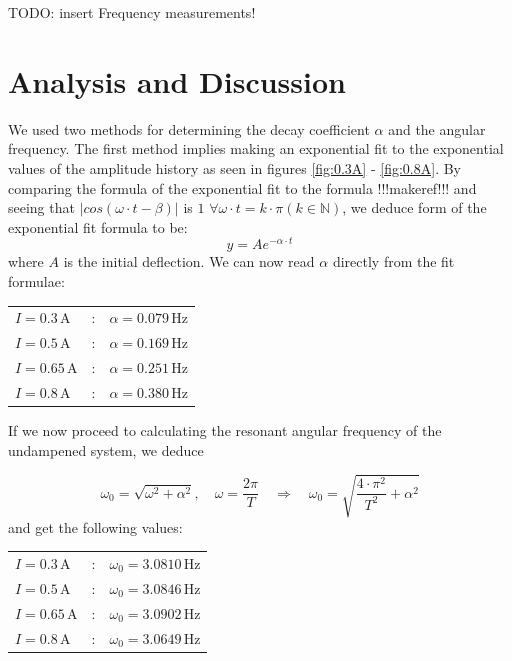 \documentclass{scrreprt}
\newcommand{\unit}[1]{\ensuremath{\, \mathrm{#1}}}
\begin{document}
TODO: insert Frequency measurements!


\section{Analysis and Discussion}
We used two methods for determining the decay coefficient $\alpha$ and the angular frequency. The first method implies making an exponential fit to the exponential values of the amplitude history as seen in figures \ref{fig:0.3A} - \ref{fig:0.8A}.  By comparing the formula of the exponential fit to the formula !!!makeref!!! and seeing that $\lvert cos(\omega\cdot t-\beta)\rvert$ is $1$ $\forall \omega \cdot t = k \cdot \pi (k \in \mathbb{N})$, we deduce form of the exponential fit formula to be:
\begin{equation}
y = Ae^{- \alpha \cdot t}
\end{equation}
where $A$ is the initial deflection.
We can now read $\alpha$ directly from the fit formulae:

\begin{table}[h]
\center
\begin{tabular}{lcl}
$I = 0.3 \unit{A}$ &:& $\alpha = 0.079\unit{Hz}$\\
$I = 0.5 \unit{A}$ &:& $\alpha = 0.169\unit{Hz}$\\
$I = 0.65 \unit{A}$ &:& $\alpha = 0.251\unit{Hz}$\\
$I = 0.8 \unit{A}$ &:& $\alpha = 0.380\unit{Hz}$
\end{tabular}
\end{table}

If we now proceed to calculating the resonant angular frequency of the undampened system, we deduce

\begin{equation}
\omega_0 = \sqrt{\omega^2+\alpha^2}, \quad \omega = \frac{2 \pi}{T} \quad \Longrightarrow \quad \omega_0 = \sqrt{\frac{4\cdot\pi^2}{T^2} + \alpha^2}
\end{equation}
and get the following values:

\begin{table}[h]
\center
\begin{tabular}{lcl}
$I = 0.3 \unit{A}$ &:& $\omega_0 = 3.0810\unit{Hz}$\\
$I = 0.5 \unit{A}$ &:& $\omega_0 = 3.0846\unit{Hz}$\\
$I = 0.65 \unit{A}$ &:& $\omega_0 = 3.0902\unit{Hz}$\\
$I = 0.8 \unit{A}$ &:& $\omega_0 = 3.0649\unit{Hz}$
\end{tabular}
\end{table}
\end{document}
